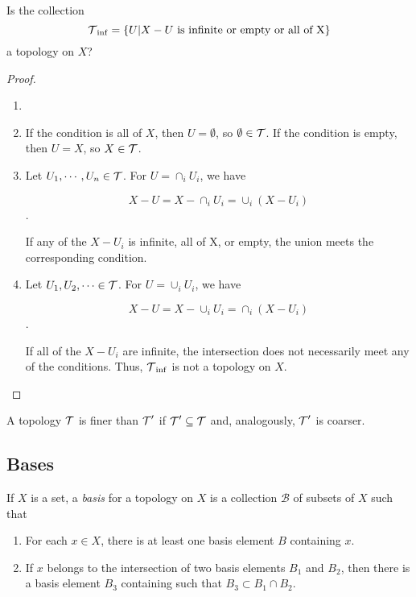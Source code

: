 \documentclass{article}
\begin{document}
\begin{lemma}
  Is the collection
  \[\operatorname{\mathcal{T}}_{\inf} = \{U | X - U \text{ is infinite or empty or all of X}\}\]
  a topology on $X$?
\end{lemma}
\begin{proof}
  \begin{enumerate}
    \item[]
    \item If the condition is all of $X$, then $U = \emptyset$, so $\emptyset \in \operatorname{\mathcal{T}}$. If the condition is empty, then $U = X$, so $X \in \operatorname{\mathcal{T}}$.

    \item Let $U_{1}, \cdots, U_{n} \in \operatorname{\mathcal{T}}$. For $U = \cap_{i} U_{i}$, we have

          \[X - U =  X - \cap_{i} U_{i} = \cup_{i} (X - U_{i}) \].

          If any of the $X - U_{i}$ is infinite, all of X, or empty, the union meets the corresponding condition.

    \item Let $U_{1}, U_{2}, \cdots \in \operatorname{\mathcal{T}}$. For $U = \cup_{i} U_{i}$, we have

          \[X - U = X - \cup_{i} U_{i} = \cap_{i} ( X - U_{i} )\].

          If all of the $X - U_{i}$ are infinite, the intersection does not necessarily meet any of the conditions. Thus, $\operatorname{\mathcal{T}}_{\inf}$ is not a topology on $X$.
  \end{enumerate}
\end{proof}

\begin{definition}[Munkres]
  A topology $\operatorname{\mathcal{T}}$ is finer than $\operatorname{\mathcal{T}}'$ if $\operatorname{\mathcal{T}}' \subseteq \operatorname{\mathcal{T}}$ and, analogously, $\operatorname{\mathcal{T}}'$ is coarser.
\end{definition}

\subsection{Bases}

\begin{definition}[Munkres]
  If $X$ is a set, a \textit{basis} for a topology on $X$ is a collection $\mathcal{B}$ of subsets of $X$ such that
  \begin{enumerate}
    \item For each $x \in X$, there is at least one basis element $B$ containing $x$.
    \item If $x$ belongs to the intersection of two basis elements $B_{1}$ and $B_{2}$, then there is a basis element $B_{3}$ containing such that $B_{3} \subset B_{1} \cap B_{2}$.
  \end{enumerate}
\end{definition}
\end{document}
